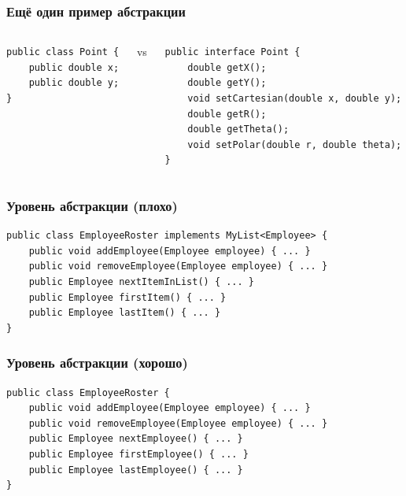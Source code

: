 \documentclass[xetex,mathserif,serif]{beamer}
\begin{document}
    \begin{frame}[fragile]
        \frametitle{Ещё один пример абстракции}
        \begin{columns}
            \begin{column}{0.32\textwidth}
                \begin{verbatim}
public class Point {
    public double x;
    public double y;
}
                \end{verbatim}
            \end{column}
            \begin{column}{0.05\textwidth}
                vs
            \end{column}
            \begin{column}{0.6\textwidth}
                \begin{verbatim}
public interface Point {
    double getX();
    double getY();
    void setCartesian(double x, double y);
    double getR();
    double getTheta();
    void setPolar(double r, double theta);
}
                \end{verbatim}
            \end{column}
        \end{columns}
    \end{frame}

    \begin{frame}[fragile]
        \frametitle{Уровень абстракции (плохо)}
        \begin{verbatim}
public class EmployeeRoster implements MyList<Employee> {
    public void addEmployee(Employee employee) { ... }
    public void removeEmployee(Employee employee) { ... }
    public Employee nextItemInList() { ... }
    public Employee firstItem() { ... }
    public Employee lastItem() { ... }
}
        \end{verbatim}
    \end{frame}

    \begin{frame}[fragile]
        \frametitle{Уровень абстракции (хорошо)}
        \begin{verbatim}
public class EmployeeRoster {
    public void addEmployee(Employee employee) { ... }
    public void removeEmployee(Employee employee) { ... }
    public Employee nextEmployee() { ... }
    public Employee firstEmployee() { ... }
    public Employee lastEmployee() { ... }
}
        \end{verbatim}
    \end{frame}
\end{document}
